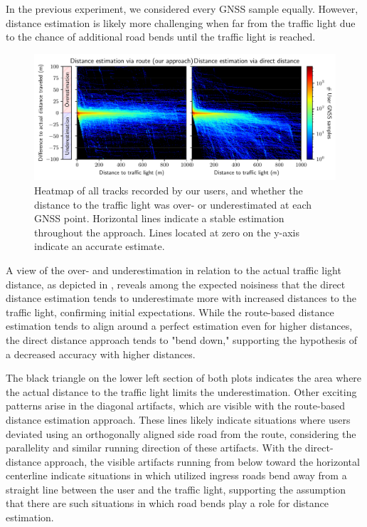 In the previous experiment, we considered every GNSS sample equally. However, distance estimation is likely more challenging when far from the traffic light due to the chance of additional road bends until the traffic light is reached. 

\begin{figure}[t]
\centering 
\includegraphics[width=\linewidth]{images/routing-distance-scatter.pdf}
\caption{Heatmap of all tracks recorded by our users, and whether the distance to the traffic light was over- or underestimated at each GNSS point. Horizontal lines indicate a stable estimation throughout the approach. Lines located at zero on the y-axis indicate an accurate estimate.}
\label{fig:routing-distance-scatter}
\end{figure}

A view of the over- and underestimation in relation to the actual traffic light distance, as depicted in , reveals among the expected noisiness that the direct distance estimation tends to underestimate more with increased distances to the traffic light, confirming initial expectations. While the route-based distance estimation tends to align around a perfect estimation even for higher distances, the direct distance approach tends to "bend down," supporting the hypothesis of a decreased accuracy with higher distances. 

The black triangle on the lower left section of both plots indicates the area where the actual distance to the traffic light limits the underestimation. Other exciting patterns arise in the diagonal artifacts, which are visible with the route-based distance estimation approach. These lines likely indicate situations where users deviated using an orthogonally aligned side road from the route, considering the parallelity and similar running direction of these artifacts. With the direct-distance approach, the visible artifacts running from below toward the horizontal centerline indicate situations in which utilized ingress roads bend away from a straight line between the user and the traffic light, supporting the assumption that there are such situations in which road bends play a role for distance estimation.

